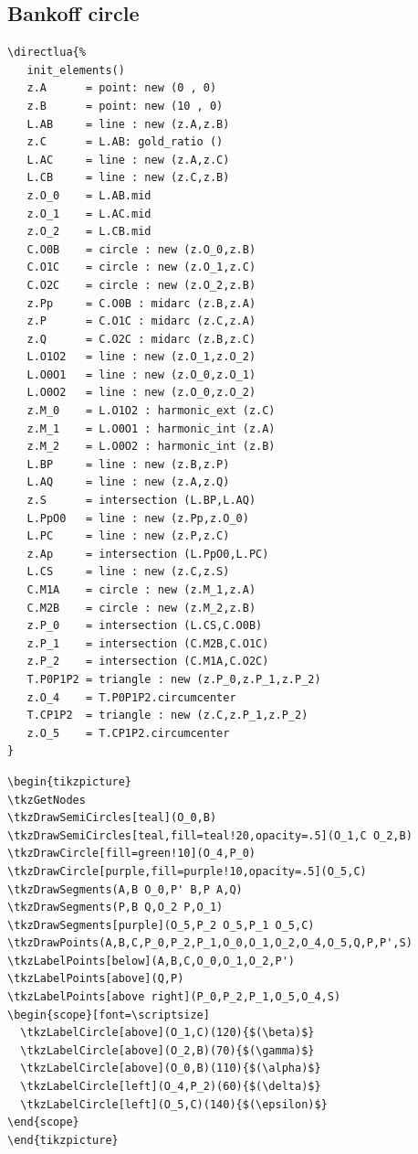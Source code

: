 \subsection{Bankoff circle} %
\label{sub:bankoff_circle}
\begin{Verbatim}
\directlua{%
   init_elements()
   z.A      = point: new (0 , 0)
   z.B      = point: new (10 , 0)
   L.AB     = line : new (z.A,z.B)
   z.C      = L.AB: gold_ratio ()
   L.AC     = line : new (z.A,z.C)
   L.CB     = line : new (z.C,z.B)
   z.O_0    = L.AB.mid
   z.O_1    = L.AC.mid
   z.O_2    = L.CB.mid
   C.O0B    = circle : new (z.O_0,z.B)
   C.O1C    = circle : new (z.O_1,z.C)
   C.O2C    = circle : new (z.O_2,z.B)
   z.Pp     = C.O0B : midarc (z.B,z.A)
   z.P      = C.O1C : midarc (z.C,z.A)
   z.Q      = C.O2C : midarc (z.B,z.C)
   L.O1O2   = line : new (z.O_1,z.O_2)
   L.O0O1   = line : new (z.O_0,z.O_1)
   L.O0O2   = line : new (z.O_0,z.O_2)
   z.M_0    = L.O1O2 : harmonic_ext (z.C)
   z.M_1    = L.O0O1 : harmonic_int (z.A)
   z.M_2    = L.O0O2 : harmonic_int (z.B)
   L.BP     = line : new (z.B,z.P)
   L.AQ     = line : new (z.A,z.Q)
   z.S      = intersection (L.BP,L.AQ)
   L.PpO0   = line : new (z.Pp,z.O_0)
   L.PC     = line : new (z.P,z.C)
   z.Ap     = intersection (L.PpO0,L.PC)
   L.CS     = line : new (z.C,z.S)
   C.M1A    = circle : new (z.M_1,z.A)
   C.M2B    = circle : new (z.M_2,z.B)
   z.P_0    = intersection (L.CS,C.O0B)
   z.P_1    = intersection (C.M2B,C.O1C)
   z.P_2    = intersection (C.M1A,C.O2C)
   T.P0P1P2 = triangle : new (z.P_0,z.P_1,z.P_2)
   z.O_4    = T.P0P1P2.circumcenter
   T.CP1P2  = triangle : new (z.C,z.P_1,z.P_2)
   z.O_5    = T.CP1P2.circumcenter
}
\end{Verbatim}

\begin{Verbatim}
\begin{tikzpicture}
\tkzGetNodes
\tkzDrawSemiCircles[teal](O_0,B)
\tkzDrawSemiCircles[teal,fill=teal!20,opacity=.5](O_1,C O_2,B)
\tkzDrawCircle[fill=green!10](O_4,P_0)
\tkzDrawCircle[purple,fill=purple!10,opacity=.5](O_5,C)
\tkzDrawSegments(A,B O_0,P' B,P A,Q)
\tkzDrawSegments(P,B Q,O_2 P,O_1)
\tkzDrawSegments[purple](O_5,P_2 O_5,P_1 O_5,C)
\tkzDrawPoints(A,B,C,P_0,P_2,P_1,O_0,O_1,O_2,O_4,O_5,Q,P,P',S)
\tkzLabelPoints[below](A,B,C,O_0,O_1,O_2,P')
\tkzLabelPoints[above](Q,P)
\tkzLabelPoints[above right](P_0,P_2,P_1,O_5,O_4,S)
\begin{scope}[font=\scriptsize]
  \tkzLabelCircle[above](O_1,C)(120){$(\beta)$}
  \tkzLabelCircle[above](O_2,B)(70){$(\gamma)$}
  \tkzLabelCircle[above](O_0,B)(110){$(\alpha)$}
  \tkzLabelCircle[left](O_4,P_2)(60){$(\delta)$}
  \tkzLabelCircle[left](O_5,C)(140){$(\epsilon)$}
\end{scope}
\end{tikzpicture}
\end{Verbatim}


